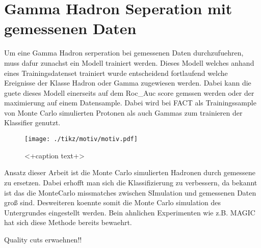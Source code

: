 \chapter{Gamma Hadron Seperation mit gemessenen Daten}
Um eine Gamma Hadron serperation bei gemessenen Daten durchzufuehren, muss dafur zunachst ein Modell trainiert werden. Dieses Modell welches anhand eines Trainingsdatenset trainiert wurde entscheidend fortlaufend welche Ereignisse der Klasse Hadron oder Gamma zugewiesen werden. Dabei kann die guete dieses Modell einerseits auf dem Roc\_Auc score gemssen werden oder der maximierung auf einem Datensample. Dabei wird bei FACT als Trainingssample von Monte Carlo simulierten Protonen als auch Gammas zum trainieren der Klassifier genutzt.
\begin{figure}[H]
  \centering
  \texttt{[image: ./tikz/motiv/motiv.pdf]}
  \caption{<+caption text+>}
  \label{fig:<+label+>}
\end{figure}
Ansatz dieser Arbeit ist die Monte Carlo simulierten Hadronen durch gemessene zu ersetzen. Dabei erhofft man sich die Klassifizierung zu verbessern, da bekannt ist das die MonteCarlo missmatches zwischen SImulation und gemessenen Daten groß sind. Desweiteren koennte somit die Monte Carlo simulation des Untergrundes eingestellt werden. Bein ahnlichen Experimenten wie z.B. MAGIC hat sich diese Methode bereits bewaehrt. 

Quality cuts erwaehnen!!

